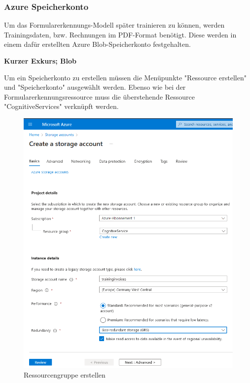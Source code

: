 \subsubsection{Azure Speicherkonto}\label{sec:azure-blob}
Um das Formularerkennungs-Modell später trainieren zu können, werden Trainingsdaten, bzw. Rechnungen im PDF-Format benötigt.
Diese werden in einem dafür erstellten Azure Blob-Speicherkonto festgehalten.

\textbf{Kurzer Exkurs; Blob}


Um ein Speicherkonto zu erstellen müssen die Menüpunkte "Ressource erstellen" und "Speicherkonto" ausgewählt werden. Ebenso wie
bei der Formularerkennungsressource muss die überstehende Ressource "CognitiveServices" verknüpft werden.

\begin{figure}[h]
    \centering
    \includegraphics[scale=0.6]{sections/cloud-computing/images/azure-speicherkonto.PNG}
    \caption{Ressourcengruppe erstellen}
    \label{fig:ressourcen-erstellen}
\end{figure}

